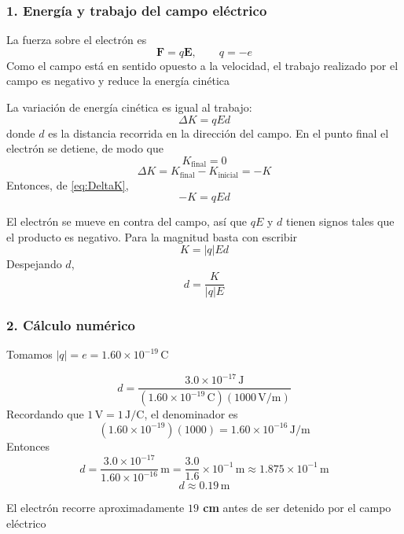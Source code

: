 \documentclass{article}
\begin{document}
\subsubsection*{1. Energía y trabajo del campo eléctrico}

La fuerza sobre el electrón es
\[
\mathbf{F} = q\mathbf{E},
\qquad q = -e
\]
Como el campo está en sentido opuesto a la velocidad, el trabajo realizado por el campo es negativo y reduce la energía cinética

La variación de energía cinética es igual al trabajo:
\begin{equation}
\Delta K = q E d
\label{eq:DeltaK}
\end{equation}
donde $d$ es la distancia recorrida en la dirección del campo. En el punto final el electrón se detiene, de modo que
\[
K_{\text{final}} = 0
\]
\[
\Delta K = K_{\text{final}} - K_{\text{inicial}} = -K
\]
Entonces, de \eqref{eq:DeltaK},
\begin{equation}
-K = q E d
\label{eq:ecuacion-K-qEd}
\end{equation}

El electrón se mueve en contra del campo, así que $qE$ y $d$ tienen signos tales que el producto es negativo. Para la magnitud basta con escribir
\begin{equation}
K = |q| E d
\label{eq:K-magnitud}
\end{equation}
Despejando $d$,
\begin{equation}
d = \frac{K}{|q| E}
\label{eq:d-expresion}
\end{equation}

\subsubsection*{2. Cálculo numérico}

Tomamos $|q| = e = 1.60\times 10^{-19}\,\text{C}$

\[
d = \frac{3.0\times 10^{-17}\,\text{J}}{(1.60\times 10^{-19}\,\text{C})(1000\,\text{V/m})}
\]
Recordando que $1\,\text{V} = 1\,\text{J/C}$, el denominador es
\[
(1.60\times 10^{-19})(1000) = 1.60\times 10^{-16}\,\text{J/m}
\]
Entonces
\[
d = \frac{3.0\times 10^{-17}}{1.60\times 10^{-16}}\,\text{m}
= \frac{3.0}{1.6}\times 10^{-1}\,\text{m}
\approx 1.875\times 10^{-1}\,\text{m}
\]
\begin{equation}
d \approx 0.19\,\text{m}
\label{eq:d-valor}
\end{equation}

El electrón recorre aproximadamente \textbf{$19$ cm} antes de ser detenido por el campo eléctrico
\end{document}
